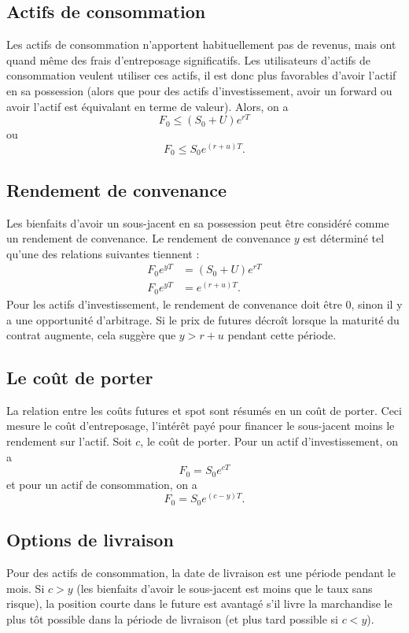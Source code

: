 \subsection{Actifs de consommation}

Les actifs de consommation n'apportent habituellement pas de revenus, mais ont quand même des frais d'entreposage significatifs. Les utilisateurs d'actifs de consommation veulent utiliser ces actifs, il est donc plus favorables d'avoir l'actif en sa possession (alors que pour des actifs d'investissement, avoir un forward ou avoir l'actif est équivalant en terme de valeur). Alors, on a 
$$F_0 \leq (S_0 + U) e^{rT}$$
ou
$$F_0 \leq S_0 e^{(r + u)T}.$$

\subsection{Rendement de convenance}

Les bienfaits d'avoir un sous-jacent en sa possession peut être considéré comme un rendement de convenance. Le rendement de convenance $y$ est déterminé tel qu'une des  relations suivantes tiennent : 
\begin{align*}
F_0e^{yT} &= (S_0 + U) e^{rT}\\
F_0e^{yT} &=  e^{(r+u)T}.
\end{align*}
Pour les actifs d'investissement, le rendement de convenance doit être 0, sinon il y a une opportunité d'arbitrage. Si le prix de futures décroît lorsque la maturité du contrat augmente, cela suggère que $y > r+u$ pendant cette période. 

\subsection{Le coût de porter}

La relation entre les coûts futures et spot sont résumés en un coût de porter. Ceci mesure le coût d'entreposage, l'intérêt payé pour financer le sous-jacent moins le rendement sur l'actif. Soit $c$, le coût de porter. Pour un actif d'investissement, on a 
$$F_0 = S_0 e^{cT}$$
et pour un actif de consommation, on a 
$$F_0 = S_0 e^{(c-y)T}.$$

\subsection{Options de livraison}

Pour des actifs de consommation, la date de livraison est une période pendant le mois. Si $c>y$ (les bienfaits d'avoir le sous-jacent est moins que le taux sans risque), la position courte dans le future est avantagé s'il livre la marchandise le plus tôt possible dans la période de livraison (et plus tard possible si $c<y$).

